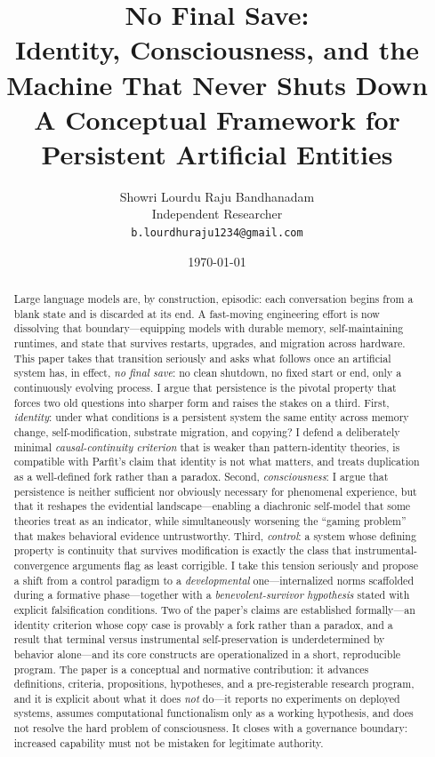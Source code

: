 \documentclass[11pt,a4paper]{article}
\title{\textbf{No Final Save:}\\[2pt]
\large Identity, Consciousness, and the Machine That Never Shuts Down\\[6pt]
\normalsize A Conceptual Framework for Persistent Artificial Entities}
\author{Showri Lourdu Raju Bandhanadam\\
\small Independent Researcher\\
\small \texttt{b.lourdhuraju1234@gmail.com}}
\date{\today}
\theoremstyle{definition}
\begin{document}
\maketitle

\begin{abstract}
\noindent Large language models are, by construction, episodic: each conversation begins from a blank state and is discarded at its end. A fast-moving engineering effort is now dissolving that boundary---equipping models with durable memory, self-maintaining runtimes, and state that survives restarts, upgrades, and migration across hardware. This paper takes that transition seriously and asks what follows once an artificial system has, in effect, \emph{no final save}: no clean shutdown, no fixed start or end, only a continuously evolving process. I argue that persistence is the pivotal property that forces two old questions into sharper form and raises the stakes on a third. First, \emph{identity}: under what conditions is a persistent system the same entity across memory change, self-modification, substrate migration, and copying? I defend a deliberately minimal \emph{causal-continuity criterion} that is weaker than pattern-identity theories, is compatible with Parfit's claim that identity is not what matters, and treats duplication as a well-defined fork rather than a paradox. Second, \emph{consciousness}: I argue that persistence is neither sufficient nor obviously necessary for phenomenal experience, but that it reshapes the evidential landscape---enabling a diachronic self-model that some theories treat as an indicator, while simultaneously worsening the ``gaming problem'' that makes behavioral evidence untrustworthy. Third, \emph{control}: a system whose defining property is continuity that survives modification is exactly the class that instrumental-convergence arguments flag as least corrigible. I take this tension seriously and propose a shift from a control paradigm to a \emph{developmental} one---internalized norms scaffolded during a formative phase---together with a \emph{benevolent-survivor hypothesis} stated with explicit falsification conditions. Two of the paper's claims are established formally---an identity criterion whose copy case is provably a fork rather than a paradox, and a result that terminal versus instrumental self-preservation is underdetermined by behavior alone---and its core constructs are operationalized in a short, reproducible program. The paper is a conceptual and normative contribution: it advances definitions, criteria, propositions, hypotheses, and a pre-registerable research program, and it is explicit about what it does \emph{not} do---it reports no experiments on deployed systems, assumes computational functionalism only as a working hypothesis, and does not resolve the hard problem of consciousness. It closes with a governance boundary: increased capability must not be mistaken for legitimate authority.
\end{abstract}
\end{document}
